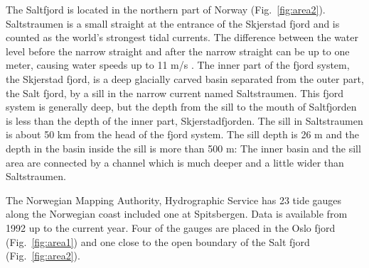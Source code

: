 The Saltfjord is located in the northern part of Norway (Fig.~\ref{fig:area2}). Saltstraumen is a small straight at the entrance of the Skjerstad fjord and is counted as the world's strongest tidal currents. The difference between the water level before the narrow straight and after the narrow straight can be up to one meter, causing water speeds up to 11 m/s \cite[]{eliassen01}.
The inner part of the fjord system, the Skjerstad fjord, is a deep glacially carved basin separated from the outer part, the Salt fjord, by a sill in the narrow current named Saltstraumen. This fjord system is generally deep, but the depth from the sill to the mouth of Saltfjorden is less than the depth of the inner part, Skjerstadfjorden. The sill in Saltstraumen is about 50 km from the head of the fjord system. The sill depth is 26 m and the depth in the basin inside the sill is more than 500 m: The inner basin and the sill area are connected by a channel which is much deeper and a little wider than Saltstraumen.

The Norwegian Mapping Authority, Hydrographic Service has 23 tide gauges along the Norwegian coast included one at Spitsbergen. Data is available from 1992 up to the current year. Four of the gauges are placed in the Oslo fjord  (Fig.~\ref{fig:area1}) and one close to the open boundary of the Salt fjord (Fig.~\ref{fig:area2}).

